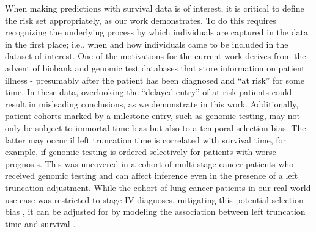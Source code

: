 \documentclass[11pt,final,fleqn]{article}\usepackage[]{graphicx}\usepackage[]{color}
\theoremstyle{plain}
\begin{document}
When making predictions with survival data is of interest, it is critical to define the risk set appropriately, as our work demonstrates. To do this requires recognizing the underlying process by which individuals are captured in the data in the first place; i.e., when and how individuals came to be included in the dataset of interest. One of the motivations for the current work derives from the advent of biobank and genomic test databases that store information on patient illness - presumably after the patient has been diagnosed and ``at risk'' for some time. In these data, overlooking the ``delayed entry'' of at-risk patients could result in misleading conclusions, as we demonstrate in this work. Additionally, patient cohorts marked by a milestone entry, such as genomic testing, may not only be subject to immortal time bias but also to a temporal selection bias. The latter may occur if left truncation time is correlated with survival time, for example, if genomic testing is ordered selectively for patients with worse prognosis. This was uncovered in a cohort of multi-stage cancer patients who received genomic testing \cite{kehl2020selectionbias} and can affect inference even in the presence of a left truncation adjustment. While the cohort of lung cancer patients in our real-world use case was restricted to stage IV diagnoses, mitigating this potential selection bias \cite{kehl2020selectionbias}, it can be adjusted for by modeling the association between left truncation time and survival \cite{thiebaut2004choice, chiou2019transformation}.


\end{document}
